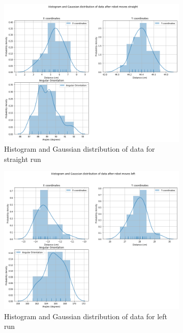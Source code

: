 \documentclass[10pt,a4paper]{article}
\begin{document}
			 \begin{figure}[H]
			 	\begin{subfigure}{\textwidth}
			 		\centering
			 		\includegraphics[width=\linewidth]{img/histplot_st.png}
			 		\caption{Histogram and Gaussian distribution of data for straight run}
			 	\end{subfigure}
			 	\caption{}%
			 \end{figure}
			 \begin{figure}[H]
			 	\begin{subfigure}{\textwidth}
			 		\centering
			 		\includegraphics[width=\linewidth]{img/histplot_lt.png}
			 		\caption{Histogram and Gaussian distribution of data for left run}
			 	\end{subfigure}
			 	\caption{}%
			\end{figure}
\end{document}
